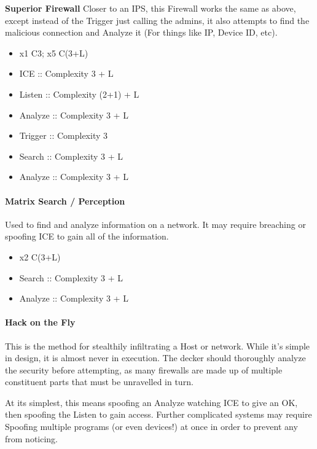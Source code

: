 \begin{multicols*}{3}
	\textbf{Superior Firewall} Closer to an IPS, this Firewall works the same as above, except instead of the Trigger just calling the admins, it also attempts to find the malicious connection and Analyze it (For things like IP, Device ID, etc).
	
	\begin{itemize}
		\itemsep 0pt
		\item x1 C3; x5 C(3+L)
		\item ICE :: Complexity 3 + L
		\item Listen :: Complexity (2+1) + L
		\item Analyze :: Complexity 3 + L
		\item Trigger :: Complexity 3
		\item Search :: Complexity 3 + L
		\item Analyze :: Complexity 3 + L
	\end{itemize}
	
	\paragraph{Matrix Search / Perception}
	
	Used to find and analyze information on a network. It may require breaching or spoofing ICE to gain all of the information.
	
	\begin{itemize}
		\itemsep 0pt
		\item x2 C(3+L)
		\item Search :: Complexity 3 + L
		\item Analyze :: Complexity 3 + L
	\end{itemize}
	
	\paragraph{Hack on the Fly}
	
	This is the method for stealthily infiltrating a Host or network. While it's simple in design, it is almost never in execution. The decker should thoroughly analyze the security before attempting, as many firewalls are made up of multiple constituent parts that must be unravelled in turn. 
	
	At its simplest, this means spoofing an Analyze watching ICE to give an OK, then spoofing the Listen to gain access. Further complicated systems may require Spoofing multiple programs (or even devices!) at once in order to prevent any from noticing.
	

\end{multicols*}
